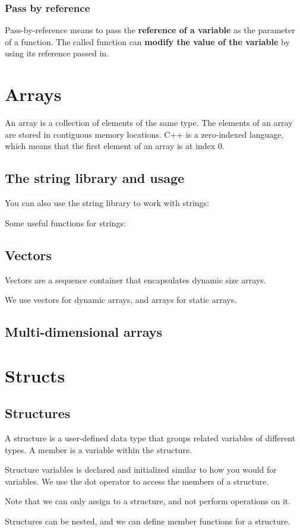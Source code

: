 \documentclass{article}
\begin{document}
\subsubsection{Pass by reference}
Pass-by-reference means to pass the \textbf{reference of a variable} as the parameter of a function. The called function can \textbf{modify the value of the variable} by using its reference passed in.


\label{sec:array}
\section{Arrays}
An array is a collection of elements of the same type. The elements of an array are stored in contiguous memory locations. C++ is a zero-indexed language, which means that the first element of an array is at index 0.



\subsection{The string library and usage}
You can also use the string library to work with strings:

Some useful functions for strings:


\subsection{Vectors}
Vectors are a sequence container that encapsulates dynamic size arrays.

We use vectors for dynamic arrays, and arrays for static arrays.

\subsection{Multi-dimensional arrays}


\section{Structs}
\subsection{Structures}
A structure is a user-defined data type that groups related variables of different types. A member is a variable within the structure.

Structure variables is declared and initialized similar to how you would for variables. We use the dot operator to access the members of a structure.

Note that we can only assign to a structure, and not perform operations on it.

Structures can be nested, and we can define member functions for a structure.

\end{document}
